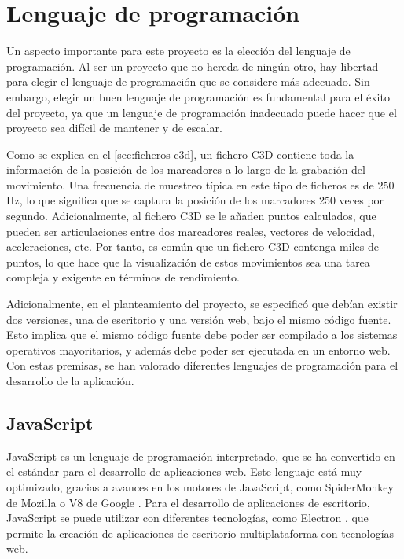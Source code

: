 
\section{Lenguaje de programación}

Un aspecto importante para este proyecto es la elección del lenguaje de programación. Al ser un proyecto que no hereda de ningún otro, hay libertad para elegir el lenguaje de programación que se considere más adecuado. Sin embargo, elegir un buen lenguaje de programación es fundamental para el éxito del proyecto, ya que un lenguaje de programación inadecuado puede hacer que el proyecto sea difícil de mantener y de escalar.

Como se explica en el \autoref{sec:ficheros-c3d}, un fichero \ac{C3D} contiene toda la información de la posición de los marcadores a lo largo de la grabación del movimiento. Una frecuencia de muestreo típica en este tipo de ficheros es de 250 \ac{Hz}, lo que significa que se captura la posición de los marcadores 250 veces por segundo. Adicionalmente, al fichero \ac{C3D} se le añaden puntos calculados, que pueden ser articulaciones entre dos marcadores reales, vectores de velocidad, aceleraciones, etc. Por tanto, es común que un fichero \ac{C3D} contenga miles de puntos, lo que hace que la visualización de estos movimientos sea una tarea compleja y exigente en términos de rendimiento.

Adicionalmente, en el planteamiento del proyecto, se especificó que debían existir dos versiones, una de escritorio y una versión web, bajo el mismo código fuente. Esto implica que el mismo código fuente debe poder ser compilado a los sistemas operativos mayoritarios, y además debe poder ser ejecutada en un entorno web. Con estas premisas, se han valorado diferentes lenguajes de programación para el desarrollo de la aplicación.  

\subsection{JavaScript}
JavaScript es un lenguaje de programación interpretado, que se ha convertido en el estándar para el desarrollo de aplicaciones web. Este lenguaje está muy optimizado, gracias a avances en los motores de JavaScript, como SpiderMonkey de Mozilla o V8 de Google \autocite{srinetChromeV8Firefox2022}. Para el desarrollo de aplicaciones de escritorio, JavaScript se puede utilizar con diferentes tecnologías, como Electron \autocite{BuildCrossplatformDesktop}, que permite la creación de aplicaciones de escritorio multiplataforma con tecnologías web. 

